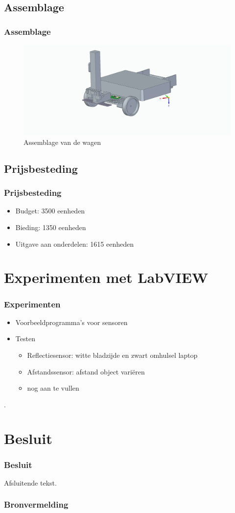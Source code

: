 \documentclass
   [kulak] %
   {kulakbeamer}
\begin{document}
\subsection{Assemblage}
\begin{frame}
	\frametitle{Assemblage}
	\begin{figure}
		\centering
		\includegraphics[width=.95\textwidth]{assemblageAuto}
		\caption{Assemblage van de wagen}
	\end{figure}
\end{frame}

\subsection{Prijsbesteding}
\begin{frame}
	\frametitle{Prijsbesteding}
	\begin{itemize}
		\item Budget: 3500 eenheden
		\item Bieding: 1350 eenheden
		\item Uitgave aan onderdelen: 1615 eenheden
	\end{itemize}
\end{frame}



\section[Experimenten]{Experimenten met LabVIEW}

\begin{frame}
	\frametitle{Experimenten}
	\begin{itemize}
		\item Voorbeeldprogramma's voor sensoren
		\item Testen
		\begin{itemize}
			\item Reflectiesensor: witte bladzijde en zwart omhulsel laptop
			\item Afstandssensor: afstand object variëren
			\item nog aan te vullen
		\end{itemize}
	\end{itemize}.
\end{frame}



\section{Besluit}
\begin{frame}
\frametitle{Besluit}
Afsluitende tekst.
\end{frame}

\begin{frame}
\frametitle{Bronvermelding}
	
	
	
\end{frame}
\end{document}
